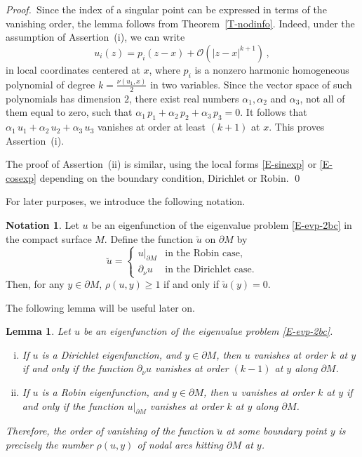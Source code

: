 \documentclass[12pt,a4paper]{amsart}
\theoremstyle{plain} %
\newtheorem{lemma}[theorem]{Lemma}
\theoremstyle{definition}
\newtheorem{notation}[theorem]{Notation}
\numberwithin{equation}{section}
\numberwithin{figure}{section}
\numberwithin{table}{section}
\newcommand{\cO}{\mathcal{O}}
\newcommand{\pf}{\emph{Proof.~}}
\begin{document}
\pf Since the index of a singular point can be expressed in terms of the vanishing order, the lemma follows from Theorem~\ref{T-nodinfo}. Indeed, under the assumption of Assertion~(i), we can write
%
\begin{equation*}
u_i(z) = p_i(z-x) + \cO(|z-x|^{k+1})\,,
\end{equation*}
%
in local coordinates centered at $x$,  where $p_i$ is a nonzero harmonic homogeneous polynomial of degree $k = \frac{\nu(u_1,x)}{2}$ in two variables. Since the vector space of such polynomials has dimension $2$, there exist real numbers $\alpha_1, \alpha_2$ and $\alpha_3$, not all of them equal to zero, such that $\alpha_1 \, p_1 + \alpha_2 \, p_2 + \alpha_3 \, p_3 = 0$. It follows that $\alpha_1 \, u_1 + \alpha_2 \, u_2 + \alpha_3 \, u_3$ vanishes at order at least $(k+1)$ at $x$. This proves Assertion~(i). \smallskip

The proof of Assertion~(ii) is similar, using the local forms \eqref{E-sinexp} or \eqref{E-cosexp} depending on the boundary condition, Dirichlet or Robin.
\hfill \qed \medskip

For later purposes, we introduce the following notation.


\begin{notation}\label{N-evp-dr}
Let $u$ be an eigenfunction of the eigenvalue problem \eqref{E-evp-2bc} in the compact surface $M$. Define the function $\breve{u}$ on $\partial M$ by
%
\begin{equation}\label{E-evp-dr}
\breve{u} = \left\{
\begin{array}{ll}
u|_{\partial M} & \text{in the Robin case,}\\[5pt]
\partial_{\nu}u & \text{in the Dirichlet case.}
\end{array}
\right.
\end{equation}
Then, for any $y \in \partial M$, $\rho(u,y) \ge 1$ if and only if
$\breve{u}(y) = 0$.
\end{notation}%

The following lemma will be useful later on.


\begin{lemma}\label{L-breve}
Let $u$ be an eigenfunction of the eigenvalue problem \eqref{E-evp-2bc}.
\begin{enumerate}[(i)]
  \item If $u$ is a Dirichlet eigenfunction, and $y \in \partial M$, then $u$ vanishes at order $k$ at $y$ if and only if the function $\partial_{\nu}u$ vanishes at order $(k-1)$ at $y$ along $\partial M$.
  \item If $u$ is a Robin eigenfunction, and $y \in \partial M$, then $u$ vanishes at order $k$ at $y$ if and only if the function $u|_{\partial M}$ vanishes at order $k$ at $y$ along $\partial M$.
\end{enumerate}
Therefore, the order of vanishing of the function $\breve{u}$ at some boundary point $y$ is precisely the number $\rho(u,y)$ of nodal  arcs hitting $\partial M$ at $y$.
\end{lemma}%
\end{document}
